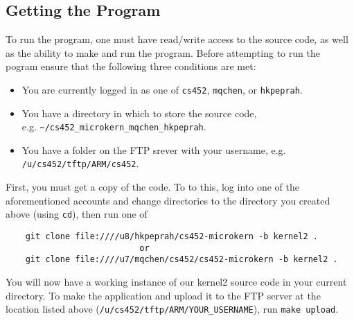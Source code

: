 \documentclass[12pt]{article}
\begin{document}
\subsection{Getting the Program}
To run the program, one must have read/write access to the source code, as well as the ability to make and run the program.  Before attempting to run the pogram ensure that the following three conditions are met:
\begin{itemize}
  \item You are currently logged in as one of \texttt{cs452}, \texttt{mqchen}, or \texttt{hkpeprah}.
  \item You have a directory in which to store the source code, \\ e.g. \texttt{\textasciitilde/cs452\_microkern\_mqchen\_hkpeprah}.
  \item You have a folder on the FTP srever with your username, e.g. \texttt{/u/cs452/tftp/ARM/cs452}.
\end{itemize}
First, you must get a copy of the code.  To to this, log into one of the aforementioned accounts and change directories to the directory you created above (using \texttt{cd}), then run one of
\begin{center}
  \begin{verbatim}
    git clone file:////u8/hkpeprah/cs452-microkern -b kernel2 .
                           or
    git clone file:////u7/mqchen/cs452/cs452-microkern -b kernel2 .
  \end{verbatim}
\end{center}
\vspace{-0.5cm}You will now have a working instance of our kernel2 source code in your current directory.  To make the application and upload it to the FTP server at the location listed above (\texttt{/u/cs452/tftp/ARM/YOUR\_USERNAME}), run \texttt{make upload}.
\\[1\baselineskip]
\end{document}
